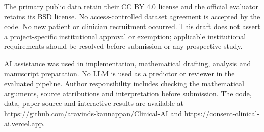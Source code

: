 The primary public data retain their CC BY 4.0 license and the official evaluator retains its BSD license. No access-controlled dataset agreement is accepted by the code. No new patient or clinician recruitment occurred. This draft does not assert a project-specific institutional approval or exemption; applicable institutional requirements should be resolved before submission or any prospective study.

AI assistance was used in implementation, mathematical drafting, analysis and manuscript preparation. No LLM is used as a predictor or reviewer in the evaluated pipeline. Author responsibility includes checking the mathematical arguments, source attributions and interpretation before submission. The code, data, paper source and interactive results are available at \url{https://github.com/aravinds-kannappan/Clinical-AI} and \url{https://consent-clinical-ai.vercel.app}.
